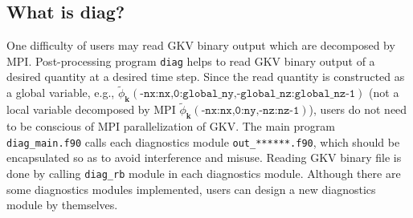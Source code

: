 \subsection{What is diag?}
One difficulty of users may read GKV binary output which are decomposed by MPI. Post-processing program \texttt{diag} helps to read GKV binary output of a desired quantity at a desired time step. Since the read quantity is constructed as a global variable, e.g., $\tilde{\phi}_{\bm{k}}(\texttt{-nx:nx,0:global\_ny,-global\_nz:global\_nz-1})$ (not a local variable decomposed by MPI $\tilde{\phi}_{\bm{k}}(\texttt{-nx:nx,0:ny,-nz:nz-1})$), users do not need to be conscious of MPI parallelization of GKV. The main program \texttt{diag\_main.f90} calls each diagnostics module \texttt{out\_******.f90}, which should be encapsulated so as to avoid interference and misuse. Reading GKV binary file is done by calling \texttt{diag\_rb} module in each diagnostics module. Although there are some diagnostics modules implemented, users can design a new diagnostics module by themselves.

